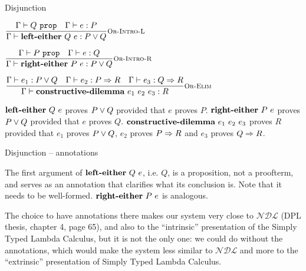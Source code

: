 \documentclass{beamer}
\newcommand{\NDL}{\mathcal{NDL}}
\begin{document}
\begin{frame}{Disjunction}

\begin{center}
  $\infrule[Or-Intro-L]{\prop{Q} \quad \proves{e}{P}}{\proves{\orintrol[Q]{e}}{\Or{P}{Q}}}$

  \vspace{2em}

  $\infrule[Or-Intro-R]{\prop{P} \quad \proves{e}{Q}}{\proves{\orintror[P]{e}}{\Or{P}{Q}}}$

  \vspace{2em}

  $\infrule[Or-Elim]{\proves{e_1}{\Or{P}{Q}} \quad \proves{e_2}{\Impl{P}{R}} \quad \proves{e_3}{\Impl{Q}{R}}}{\proves{\orelim{e_1}{e_2}{e_3}}{R}}$
\end{center}

\vspace{2em}

$\orintrol[Q]{e}$ proves $P \lor Q$ provided that $e$ proves $P$. $\orintror[P]{e}$ proves $P \lor Q$ provided that $e$ proves $Q$. $\textbf{constructive-dilemma}\ e_1\ e_2\ e_3$ proves $R$ provided that $e_1$ proves $P \lor Q$, $e_2$ proves $P \Rightarrow R$ and $e_3$ proves $Q \Rightarrow R$.

\end{frame}

\begin{frame}{Disjunction -- annotations}

The first argument of $\orintrol[Q]{e}$, i.e. $Q$, is a proposition, not a proofterm, and serves as an annotation that clarifies what its conclusion is. Note that it needs to be well-formed. $\orintror[P]{e}$ is analogous.

\vspace{2em}

The choice to have annotations there makes our system very close to $\NDL$ (DPL thesis, chapter 4, page 65), and also to the ``intrinsic'' presentation of the Simply Typed Lambda Calculus, but it is not the only one: we could do without the annotations, which would make the system less similar to $\NDL$ and more to the ``extrinsic'' presentation of Simply Typed Lambda Calculus.

\end{frame}
\end{document}
